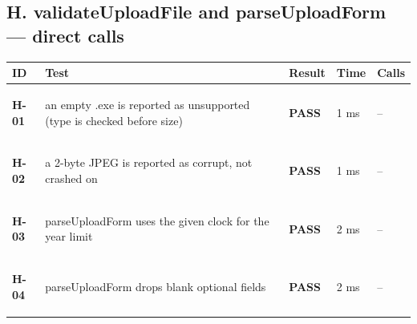\documentclass[10pt,a4paper]{article}
\begin{document}
\subsection*{H. validateUploadFile and parseUploadForm — direct calls}
\begin{longtable}{@{}P{1.2cm}P{9.2cm}P{1.2cm}P{1.3cm}P{2.4cm}@{}}
\toprule \textbf{ID} & \textbf{Test} & \textbf{Result} & \textbf{Time} & \textbf{Calls} \\ \midrule \endhead
\hypertarget{test-H-01}{\textbf{H-01}} & an empty .exe is reported as unsupported (type is checked before size) & \textcolor{passgreen}{\textbf{PASS}} & 1 ms & -- \\
\hypertarget{test-H-02}{\textbf{H-02}} & a 2-byte JPEG is reported as corrupt, not crashed on & \textcolor{passgreen}{\textbf{PASS}} & 1 ms & -- \\
\hypertarget{test-H-03}{\textbf{H-03}} & parseUploadForm uses the given clock for the year limit & \textcolor{passgreen}{\textbf{PASS}} & 2 ms & -- \\
\hypertarget{test-H-04}{\textbf{H-04}} & parseUploadForm drops blank optional fields & \textcolor{passgreen}{\textbf{PASS}} & 2 ms & -- \\
\bottomrule
\end{longtable}
\end{document}
